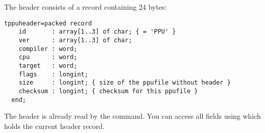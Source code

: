 \documentclass{report}
\begin{document}
The header consists of a record containing 24 bytes:

\begin{verbatim}
tppuheader=packed record                                                      
    id       : array[1..3] of char; { = 'PPU' }                                 
    ver      : array[1..3] of char;                                             
    compiler : word;                                                            
    cpu      : word;                                                            
    target   : word;                                                            
    flags    : longint;                                                         
    size     : longint; { size of the ppufile without header }                  
    checksum : longint; { checksum for this ppufile }                           
  end;                 
\end{verbatim}

The header is already read by the  command. 
You can access all fields using  which holds 
the current header record.
\end{document}
